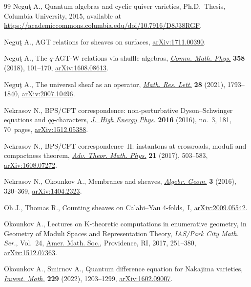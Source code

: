 \documentclass[pdftex]{sigma}%
\numberwithin{equation}{section}
\begin{document}
\begin{thebibliography}{99}
Negu\c{t} A., Quantum algebras and cyclic quiver varieties, Ph.D.~Thesis,
 {C}olumbia University, 2015, available at
 \url{https://academiccommons.columbia.edu/doi/10.7916/D8J38RGF}.

Negu\c{t} A., {AGT} relations for sheaves on surfaces, \href{https://arxiv.org/abs/1711.00390}{arXiv:1711.00390}.

Negu\c{t} A., The $q$-{AGT}-{W} relations via shuffle algebras, \href{https://doi.org/10.1007/s00220-018-3102-3}{\textit{Comm.
 Math. Phys.}} \textbf{358} (2018), 101--170, \href{https://arxiv.org/abs/1608.08613}{arXiv:1608.08613}.

Negu\c{t} A., The universal sheaf as an operator, \href{https://doi.org/10.48550/arXiv.2007.10496}{\textit{Math. Res. Lett.}}
 \textbf{28} (2021), 1793--1840, \href{https://arxiv.org/abs/2007.10496}{arXiv:2007.10496}.

Nekrasov N., BPS/CFT correspondence: non-perturbative {D}yson--{S}chwinger
 equations and $qq$-characters, \href{https://doi.org/10.1007/JHEP03(2016)181}{\textit{J.~High Energy Phys.}} \textbf{2016}
 (2016), no.~3, 181, 70~pages, \href{https://arxiv.org/abs/1512.05388}{arXiv:1512.05388}.

Nekrasov N., B{PS}/{CFT} correspondence~{II}: instantons at crossroads, moduli
 and compactness theorem, \href{https://doi.org/10.4310/ATMP.2017.v21.n2.a4}{\textit{Adv. Theor. Math. Phys.}} \textbf{21} (2017),
 503--583, \href{https://arxiv.org/abs/1608.07272}{arXiv:1608.07272}.

Nekrasov N., Okounkov A., Membranes and sheaves, \href{https://doi.org/10.14231/AG-2016-015}{\textit{Algebr. Geom.}}
 \textbf{3} (2016), 320--369, \href{https://arxiv.org/abs/1404.2323}{arXiv:1404.2323}.

Oh J., Thomas R., Counting sheaves on {C}alabi--{Y}au 4-folds,~I,
 \href{https://arxiv.org/abs/2009.05542}{arXiv:2009.05542}.

Okounkov A., Lectures on {K}-theoretic computations in enumerative geometry, in
 Geometry of Moduli Spaces and Representation Theory, \textit{IAS/Park City
 Math. Ser.}, Vol.~24, \href{https://doi.org/10.1090/pcms/024}{Amer. Math. Soc.}, Providence, RI, 2017, 251--380,
 \href{https://arxiv.org/abs/1512.07363}{arXiv:1512.07363}.

Okounkov A., Smirnov A., Quantum difference equation for {N}akajima varieties,
\href{https://doi.org/10.1007/s00222-022-01125-w}{\textit{Invent. Math.}} \textbf{229} (2022), 1203--1299,
 \href{https://arxiv.org/abs/1602.09007}{arXiv:1602.09007}.


\end{thebibliography}
\end{document}
